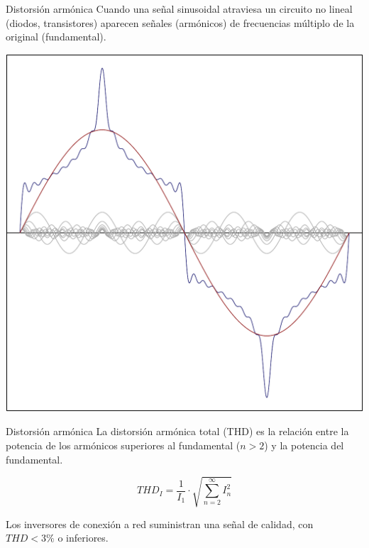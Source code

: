 \documentclass[aspectratio=169, usenames,svgnames,dvipsnames]{beamer}
\begin{document}
\begin{frame}[label={sec:org0ea7fc0}]{Distorsión armónica}
Cuando una señal sinusoidal atraviesa un circuito no lineal (diodos, transistores) aparecen señales (armónicos) de frecuencias múltiplo de la original (fundamental).


\begin{center}
\includegraphics[height=0.6\textheight]{../figs/DistorsionArmonica.pdf}
\end{center}
\end{frame}
\begin{frame}[label={sec:orgb32805a}]{Distorsión armónica}
La distorsión armónica total (THD) es la relación entre la potencia de los armónicos superiores al fundamental (\(n > 2\)) y la potencia del fundamental.

\[
  THD_I = \frac{1}{I_1} \cdot \sqrt{\sum_{n = 2}^\infty I_n^2} 
\]

Los inversores de conexión a red suministran una señal de calidad, con \(THD < 3\%\) o inferiores.
\end{frame}
\end{document}
